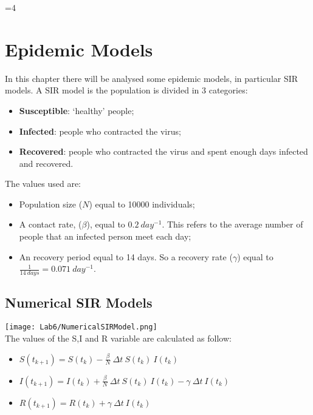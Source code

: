 \documentclass[twocolumn,letterpaper]{report}
\newcounter{debug}
\begin{document}
\ifnum\value{debug}=4 {
    
\chapter{Epidemic Models}
\noindent
	In this chapter there will be analysed some epidemic models, in particular SIR models. A SIR model is the population is divided in 3 categories:
	\begin{itemize}
					\item \textbf{Susceptible}: `healthy' people;
					\item \textbf{Infected}: people who contracted the virus;
					\item \textbf{Recovered}: people who contracted the virus and spent enough days infected and recovered.
				\end{itemize}
	\noindent
	The values used are:
	\begin{itemize}
					\item Population size ($N$) equal to 10000 individuals;
					\item A contact rate, ($\beta$), equal to $0.2 \: day^{-1}$. This refers to the average number of people that an infected person meet each day;
					\item An recovery period equal to 14 days. So a recovery rate ($\gamma$) equal to $\frac{1}{14 \: days}=0.071 \: day^{-1}$.
				\end{itemize}
				
				
	 \section{Numerical SIR Models}
	 						\texttt{[image: Lab6/NumericalSIRModel.png]} \\
								The values of the S,I and R variable are calculated as follow:
								\begin{itemize}
								  \item[] \hspace{10mm} $S(t_{k+1}) = S(t_{k}) - \frac{\beta}{N} \: \Delta t \: S(t_{k}) \: I(t_{k})$
									\item[] \hspace{10mm} $I(t_{k+1}) = I(t_{k}) + \frac{\beta}{N} \: \Delta t \: S(t_{k}) \: I(t_{k}) - \gamma \: \Delta t \: I(t_k)$
									\item[] \hspace{10mm} $R(t_{k+1}) = R(t_{k}) + \gamma \: \Delta t \: I(t_k)$
								\end{itemize}
								
}
\end{document}
